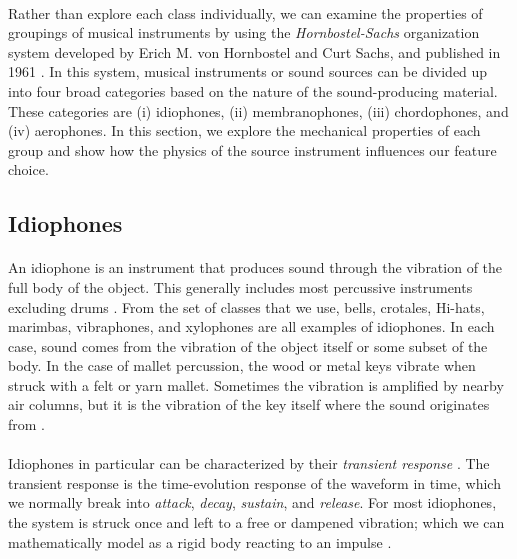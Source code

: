 \documentclass[12pt,letterpaper]{article}
\begin{document}
\paragraph*{}Rather than explore each class individually, we can examine the properties of groupings of musical instruments by using the \textit{Hornbostel-Sachs} organization system developed by  Erich M. von Hornbostel and Curt Sachs, and published in 1961 \cite{Hornbostel}. In this system, musical instruments or sound sources can be divided up into four broad categories based on the nature of the sound-producing material. These categories are (i) idiophones, (ii) membranophones, (iii) chordophones, and (iv) aerophones. In this section, we explore the mechanical properties of each group and show how the physics of the source instrument influences our feature choice.


\subsection{Idiophones}
\label{subsec-Idiophone}

\paragraph*{}An idiophone is an instrument that produces sound through the vibration of the full body of the object. This generally includes most percussive instruments excluding drums \cite{Hornbostel}. From the set of classes that we use, bells, crotales, Hi-hats, marimbas, vibraphones, and xylophones are all examples of idiophones. In each case, sound comes from the vibration of the object itself or some subset of the body. In the case of mallet percussion, the wood or metal keys vibrate when struck with a felt or yarn mallet. Sometimes the vibration is amplified by nearby air columns, but it is the vibration of the key itself where the sound originates from \cite{Olson}.

\paragraph*{}Idiophones in particular can be characterized by their \textit{transient response} \cite{White}. The transient response is the time-evolution response of the waveform in time, which we normally break into \textit{attack}, \textit{decay}, \textit{sustain}, and \textit{release}. For most idiophones, the system is struck once and left to a free or dampened vibration; which we can mathematically model as a rigid body reacting to an impulse \cite{Hunter,Olsen}.
\end{document}
